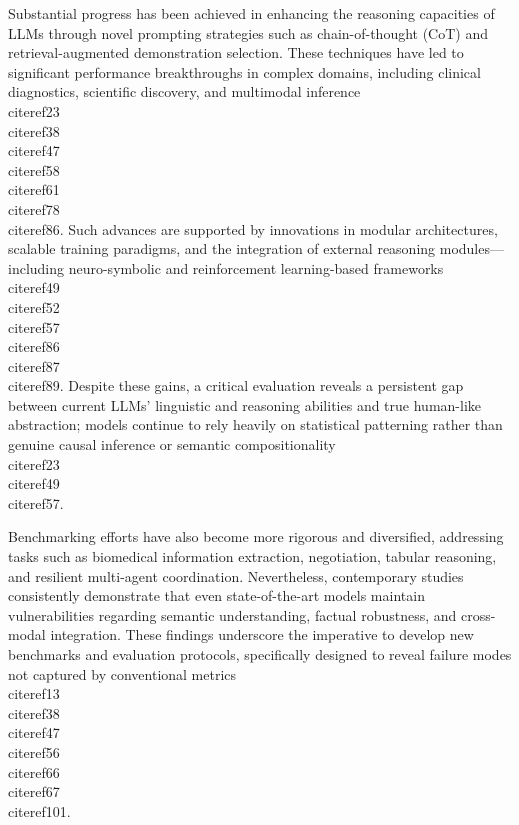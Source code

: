 \documentclass[11pt]{article}
\begin{document}
Substantial progress has been achieved in enhancing the reasoning capacities of LLMs through novel prompting strategies such as chain-of-thought (CoT) and retrieval-augmented demonstration selection. These techniques have led to significant performance breakthroughs in complex domains, including clinical diagnostics, scientific discovery, and multimodal inference~\\cite{ref23}\\cite{ref38}\\cite{ref47}\\cite{ref58}\\cite{ref61}\\cite{ref78}\\cite{ref86}. Such advances are supported by innovations in modular architectures, scalable training paradigms, and the integration of external reasoning modules—including neuro-symbolic and reinforcement learning-based frameworks~\\cite{ref49}\\cite{ref52}\\cite{ref57}\\cite{ref86}\\cite{ref87}\\cite{ref89}. Despite these gains, a critical evaluation reveals a persistent gap between current LLMs' linguistic and reasoning abilities and true human-like abstraction; models continue to rely heavily on statistical patterning rather than genuine causal inference or semantic compositionality~\\cite{ref23}\\cite{ref49}\\cite{ref57}.

Benchmarking efforts have also become more rigorous and diversified, addressing tasks such as biomedical information extraction, negotiation, tabular reasoning, and resilient multi-agent coordination. Nevertheless, contemporary studies consistently demonstrate that even state-of-the-art models maintain vulnerabilities regarding semantic understanding, factual robustness, and cross-modal integration. These findings underscore the imperative to develop new benchmarks and evaluation protocols, specifically designed to reveal failure modes not captured by conventional metrics~\\cite{ref13}\\cite{ref38}\\cite{ref47}\\cite{ref56}\\cite{ref66}\\cite{ref67}\\cite{ref101}.
\end{document}
